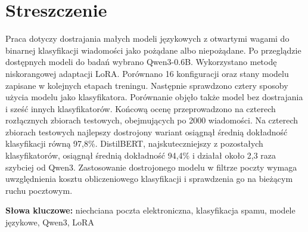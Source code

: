 \documentclass[12pt,a4paper]{article}
\begin{document}
\section*{Streszczenie}

Praca dotyczy dostrajania małych modeli językowych z otwartymi wagami do
binarnej klasyfikacji wiadomości jako pożądane albo niepożądane. Po przeglądzie
dostępnych modeli do badań wybrano Qwen3-0.6B. Wykorzystano metodę niskorangowej
adaptacji LoRA. Porównano 16 konfiguracji oraz stany modelu
zapisane w kolejnych etapach treningu. Następnie sprawdzono cztery sposoby
użycia modelu jako klasyfikatora. Porównanie objęło także model bez dostrajania
i sześć innych klasyfikatorów. Końcową ocenę przeprowadzono na czterech
rozłącznych zbiorach testowych, obejmujących po 2000 wiadomości. Na czterech
zbiorach testowych najlepszy dostrojony wariant osiągnął średnią dokładność
klasyfikacji równą 97,8\%. DistilBERT, najskuteczniejszy z pozostałych
klasyfikatorów, osiągnął średnią dokładność 94,4\% i działał około 2,3 raza
szybciej od Qwen3.
Zastosowanie dostrojonego modelu w filtrze poczty wymaga uwzględnienia kosztu
obliczeniowego klasyfikacji i sprawdzenia go na bieżącym ruchu pocztowym.

\textbf{Słowa kluczowe:} niechciana poczta elektroniczna, klasyfikacja spamu,
modele językowe, Qwen3, LoRA
\end{document}
